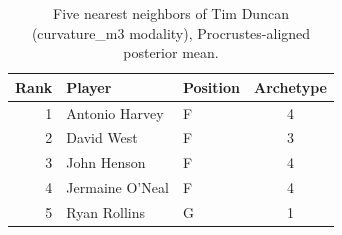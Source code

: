 \begin{table}[htbp]
  \centering\small
  \begin{tabular}{rllc}
    \toprule
    Rank & Player & Position & Archetype \\
    \midrule
    1 & Antonio Harvey & F & 4 \\
    2 & David West & F & 3 \\
    3 & John Henson & F & 4 \\
    4 & Jermaine O'Neal & F & 4 \\
    5 & Ryan Rollins & G & 1 \\
    \bottomrule
  \end{tabular}
  \caption{Five nearest neighbors of Tim Duncan (curvature_m3 modality), Procrustes-aligned posterior mean.}
  \label{tab:Tim_Duncan_neighbors_curvature_m3}
\end{table}

